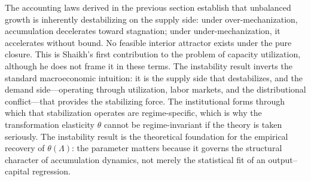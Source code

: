 The accounting laws derived in the previous section establish that unbalanced growth is inherently destabilizing on the supply side: under over-mechanization, accumulation decelerates toward stagnation; under under-mechanization, it accelerates without bound. No feasible interior attractor exists under the pure closure. This is Shaikh's first contribution to the problem of capacity utilization, although he does not frame it in these terms. The instability result inverts the standard macroeconomic intuition: it is the supply side that destabilizes, and the demand side---operating through utilization, labor markets, and the distributional conflict---that provides the stabilizing force. The institutional forms through which that stabilization operates are regime-specific, which is why the transformation elasticity $\theta$ cannot be regime-invariant if the theory is taken seriously. The instability result is the theoretical foundation for the empirical recovery of $\theta(\Lambda)$: the parameter matters because it governs the structural character of accumulation dynamics, not merely the statistical fit of an output--capital regression.

